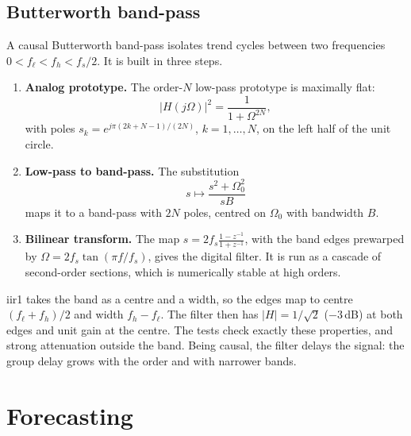 \begin{codepointers}
\end{codepointers}

\section{Butterworth band-pass}
A causal Butterworth band-pass isolates trend cycles between two frequencies
$0<f_\ell<f_h<f_s/2$. It is built in three steps.
\begin{enumerate}
  \item \textbf{Analog prototype.} The order-$N$ low-pass prototype is maximally flat:
        \[
          |H(j\Omega)|^2=\frac{1}{1+\Omega^{2N}},
        \]
        with poles $s_k=e^{j\pi(2k+N-1)/(2N)}$, $k=1,\dots,N$, on the left half of the unit
        circle.
  \item \textbf{Low-pass to band-pass.} The substitution
        \[
          s\mapsto\frac{s^2+\Omega_0^2}{sB}
        \]
        maps it to a band-pass with $2N$ poles, centred on $\Omega_0$ with bandwidth $B$.
  \item \textbf{Bilinear transform.} The map $s=2f_s\frac{1-z^{-1}}{1+z^{-1}}$, with the band
        edges prewarped by $\Omega=2f_s\tan(\pi f/f_s)$, gives the digital filter. It is run
        as a cascade of second-order sections, which is numerically stable at high orders.
\end{enumerate}
iir1 takes the band as a centre and a width, so the edges map to centre
$(f_\ell+f_h)/2$ and width $f_h-f_\ell$. The filter then has $|H|=1/\sqrt2$ ($-3$\,dB)
at both edges and unit gain at the centre. The tests check exactly these properties, and
strong attenuation outside the band. Being causal, the filter delays the signal: the
group delay grows with the order and with narrower bands.
\begin{codepointers}
\end{codepointers}

\chapter{Forecasting}\label{c:sec:forecast}

